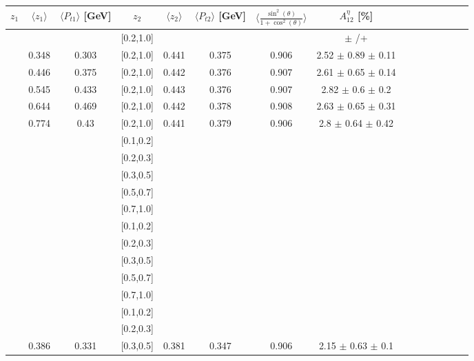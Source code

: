 \documentclass[aps,prX,preprint,groupedaddress,linenumbers]{revtex4-1}
\begin{document}
\begin{table}[H]\tiny
\centering
\renewcommand{\arraystretch}{1.5}
\begin{tabular}{|c| c| c| c| c| c| c| c| c| c|c| c| c| c| c|}
\hline
$z_1$ & $\langle  z_1\rangle$ & $\langle  P_{t1} \rangle$  [GeV] & $z_2$ & $\langle  z_2 \rangle$ & $\langle  P_{t2}  \rangle$ [GeV] & $\langle\frac{\sin^2(\theta)}{1+\cos^2(\theta)}\rangle$ & $A_{12}^{\eta}$ [\%]  \\ \hline
[0.2,0.3]	&		&		&	[0.2,1.0]	&		&		&		&		$\pm$			/+		\\ \hline
[0.3,0.4]	&	0.348	&	0.303	&	[0.2,1.0]	&	0.441	&	0.375	&	0.906	&2.52  $\pm$ 0.89  $\pm$ 0.11   \\ \hline
[0.4,0.5]	&	0.446	&	0.375	&	[0.2,1.0]	&	0.442	&	0.376	&	0.907	&2.61  $\pm$ 0.65  $\pm$ 0.14   \\ \hline
[0.5,0.6]	&	0.545	&	0.433	&	[0.2,1.0]	&	0.443	&	0.376	&	0.907	&2.82  $\pm$ 0.6  $\pm$ 0.2     \\ \hline
[0.6,0.7]	&	0.644	&	0.469	&	[0.2,1.0]	&	0.442	&	0.378	&	0.908	&2.63  $\pm$ 0.65  $\pm$ 0.31   \\ \hline
[0.7,1.0]	&	0.774	&	0.43	&	[0.2,1.0]	&	0.441	&	0.379	&	0.906	&2.8  $\pm$ 0.64  $\pm$ 0.42    \\ \hline
\hline
[0.1,0.2]	&		&		&	[0.1,0.2]	&		&		&		&							\\ \hline
[0.1,0.2]	&		&		&	[0.2,0.3]	&		&		&		&							\\ \hline
[0.1,0.2]	&		&		&	[0.3,0.5]	&		&		&		&							\\ \hline
[0.1,0.2]	&		&		&	[0.5,0.7]	&		&		&		&							\\ \hline
[0.1,0.2]	&		&		&	[0.7,1.0]	&		&		&		&							\\ \hline
\hline
[0.2,0.3]	&		&		&	[0.1,0.2]	&		&		&		&							\\ \hline
[0.2,0.3]	&		&		&	[0.2,0.3]	&		&		&		&							\\ \hline
[0.2,0.3]	&		&		&	[0.3,0.5]	&		&		&		&							\\ \hline
[0.2,0.3]	&		&		&	[0.5,0.7]	&		&		&		&							\\ \hline
[0.2,0.3]	&		&		&	[0.7,1.0]	&		&		&		&							\\ \hline
\hline
[0.3,0.5]	&		&		&	[0.1,0.2]	&		&		&		&							\\ \hline
[0.3,0.5]	&		&		&	[0.2,0.3]	&		&		&		&							\\ \hline
[0.3,0.5]	&	0.386	&	0.331	&	[0.3,0.5]	&	0.381	&	0.347	&	0.906	&	2.15  $\pm$ 0.63  $\pm$ 0.1     \\ \hline

\end{tabular}
\end{table}
\end{document}
